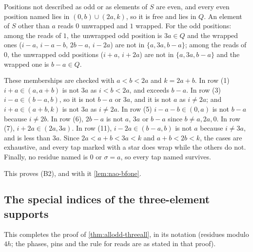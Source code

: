 Positions not described as odd or as elements of $S$ are even, and every
even position named lies in $(0,b)\cup(2a,k)$, so it is free and lies in
$Q$. An element of $S$ other than $a$ reads $0$ unwrapped and $1$ wrapped.
For the odd positions: among the reads of $1$, the unwrapped odd position is
$3a\in Q$ and the wrapped ones ($i-a$, $i-a-b$, $2b-a$, $i-2a$) are not in
$\{a,3a,b-a\}$; among the reads of $0$, the unwrapped odd positions ($i+a$,
$i+2a$) are not in $\{a,3a,b-a\}$ and the wrapped one is $b-a\in Q$.

These memberships are checked with $a<b<2a$ and $k=2a+b$. In row (1)
$i+a\in(a,a+b)$ is not $3a$ as $i<b<2a$, and exceeds $b-a$. In row (3)
$i-a\in(b-a,b)$, so it is not $b-a$ or $3a$, and it is not $a$ as $i\ne2a$;
and $i+a\in(a+b,k)$ is not $3a$ as $i\ne2a$. In row (5)
$i-a-b\in(0,a)$ is not $b-a$ because $i\ne2b$. In row (6), $2b-a$ is not
$a$, $3a$ or $b-a$ since $b\ne a,2a,0$. In row (7), $i+2a\in(2a,3a)$.
In row (11), $i-2a\in(b-a,b)$ is not $a$ because $i\ne3a$, and is less
than $3a$. Since $2a<a+b<3a<k$ and $a+b<2b<k$, the cases are exhaustive, and
every tap marked with a star does wrap while the others do not. Finally, no
residue named is $0$ or $\sigma=a$, so every tap named survives.

This proves (B2), and with it \autoref{lem:nao-bfone}.

\subsection{The special indices of the three-element supports}
\label{app:checks-threeall}

This completes the proof of \autoref{thm:allodd-threeall}, in its notation
(residues modulo $4h$; the phases, pins and the rule for reads are as stated in that proof).

